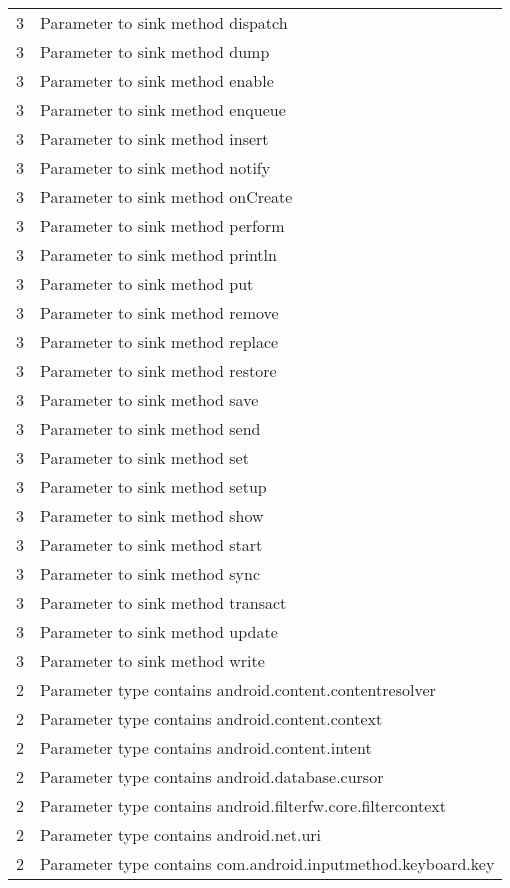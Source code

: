 \begin{center}
\begin{longtable}{l|l}
    3 & Parameter to sink method dispatch \\
    3 & Parameter to sink method dump \\
    3 & Parameter to sink method enable \\
    3 & Parameter to sink method enqueue \\
    3 & Parameter to sink method insert \\
    3 & Parameter to sink method notify \\
    3 & Parameter to sink method onCreate \\
    3 & Parameter to sink method perform \\
    3 & Parameter to sink method println \\
    3 & Parameter to sink method put \\
    3 & Parameter to sink method remove \\
    3 & Parameter to sink method replace \\
    3 & Parameter to sink method restore \\
    3 & Parameter to sink method save \\
    3 & Parameter to sink method send \\
    3 & Parameter to sink method set \\
    3 & Parameter to sink method setup \\
    3 & Parameter to sink method show \\
    3 & Parameter to sink method start \\
    3 & Parameter to sink method sync \\
    3 & Parameter to sink method transact \\
    3 & Parameter to sink method update \\
    3 & Parameter to sink method write \\
    2 & Parameter type contains android.content.contentresolver \\
    2 & Parameter type contains android.content.context \\
    2 & Parameter type contains android.content.intent \\
    2 & Parameter type contains android.database.cursor \\
    2 & Parameter type contains android.filterfw.core.filtercontext \\
    2 & Parameter type contains android.net.uri \\
    2 & Parameter type contains com.android.inputmethod.keyboard.key \\

\end{longtable}
\end{center}
